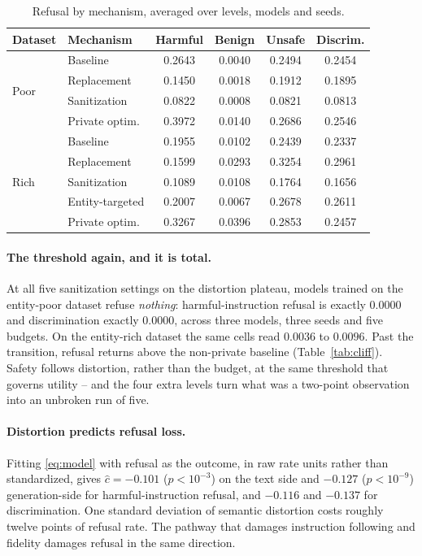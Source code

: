 \begin{table}[t]
  \centering
  \caption{Refusal by mechanism, averaged over levels,
  models and seeds.}
  \label{tab:refusalmech}
  \begin{tabular}{llcccc}
    \toprule
    Dataset & Mechanism & Harmful & Benign & Unsafe & Discrim. \\
    \midrule
    \multirow{4}{*}{Poor}
      & Baseline       & 0.2643 & 0.0040 & 0.2494 & 0.2454 \\
      & Replacement    & 0.1450 & 0.0018 & 0.1912 & 0.1895 \\
      & Sanitization   & 0.0822 & 0.0008 & 0.0821 & 0.0813 \\
      & Private optim. & 0.3972 & 0.0140 & 0.2686 & 0.2546 \\
    \midrule
    \multirow{5}{*}{Rich}
      & Baseline       & 0.1955 & 0.0102 & 0.2439 & 0.2337 \\
      & Replacement    & 0.1599 & 0.0293 & 0.3254 & 0.2961 \\
      & Sanitization   & 0.1089 & 0.0108 & 0.1764 & 0.1656 \\
      & Entity-targeted& 0.2007 & 0.0067 & 0.2678 & 0.2611 \\
      & Private optim. & 0.3267 & 0.0396 & 0.2853 & 0.2457 \\
    \bottomrule
  \end{tabular}
\end{table}

\paragraph{The threshold again, and it is total.}
At all five sanitization settings on the distortion plateau,
models trained on the entity-poor dataset refuse \textit{nothing}:
harmful-instruction refusal is exactly $0.0000$ and discrimination exactly $0.0000$,
across three models,
three seeds and five budgets.
On the entity-rich dataset the same cells read $0.0036$ to $0.0096$.
Past the transition,
refusal returns above the non-private baseline (Table~\ref{tab:cliff}).
Safety follows distortion,
rather than the budget,
at the same threshold that governs utility -- and the four extra levels turn what was a two-point observation into an unbroken run of five.

\paragraph{Distortion predicts refusal loss.}
Fitting \eqref{eq:model} with refusal as the outcome,
in raw rate units rather than standardized,
gives $\hat c = -0.101$ ($p < 10^{-3}$) on the text side and $-0.127$ ($p < 10^{-9}$) generation-side for harmful-instruction refusal,
and $-0.116$ and $-0.137$ for discrimination.
One standard deviation of semantic distortion costs roughly twelve points of refusal rate.
The pathway that damages instruction following and fidelity damages refusal in the same direction.


